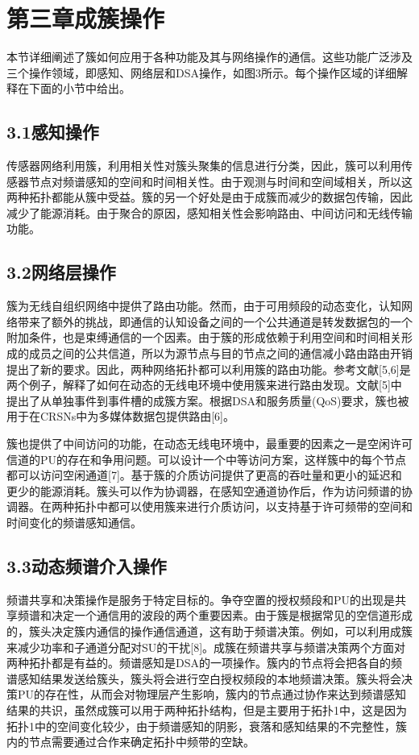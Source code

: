 \documentclass[a4paper,AutoFakeBold,oneside,12pt]{book}
\begin{document}
\chapter*{第三章\quad{}成簇操作}
\newtranschapter 

  本节详细阐述了簇如何应用于各种功能及其与网络操作的通信。这些功能广泛涉及三个操作领域，即感知、网络层和DSA操作，如图3所示。每个操作区域的详细解释在下面的小节中给出。
 
 \section*{3.1\quad{}感知操作}


  传感器网络利用簇，利用相关性对簇头聚集的信息进行分类，因此，簇可以利用传感器节点对频谱感知的空间和时间相关性。由于观测与时间和空间域相关，所以这两种拓扑都能从簇中受益。簇的另一个好处是由于成簇而减少的数据包传输，因此减少了能源消耗。由于聚合的原因，感知相关性会影响路由、中间访问和无线传输功能。
  
 \section*{3.2\quad{}网络层操作}

  簇为无线自组织网络中提供了路由功能。然而，由于可用频段的动态变化，认知网络带来了额外的挑战，即通信的认知设备之间的一个公共通道是转发数据包的一个附加条件，也是束缚通信的一个因素。由于簇的形成依赖于利用空间和时间相关形成的成员之间的公共信道，所以为源节点与目的节点之间的通信减小路由路由开销提出了新的要求。因此，两种网络拓扑都可以利用簇的路由功能。参考文献[5,6]是两个例子，解释了如何在动态的无线电环境中使用簇来进行路由发现。文献[5]中提出了从单独事件到事件槽的成簇方案。根据DSA和服务质量(QoS)要求，簇也被用于在CRSNs中为多媒体数据包提供路由[6]。

  簇也提供了中间访问的功能，在动态无线电环境中，最重要的因素之一是空闲许可信道的PU的存在和争用问题。可以设计一个中等访问方案，这样簇中的每个节点都可以访问空闲通道[7]。基于簇的介质访问提供了更高的吞吐量和更小的延迟和更少的能源消耗。簇头可以作为协调器，在感知空通道协作后，作为访问频谱的协调器。在两种拓扑中都可以使用簇来进行介质访问，以支持基于许可频带的空间和时间变化的频谱感知通信。

 \section*{3.3\quad{}动态频谱介入操作}

  频谱共享和决策操作是服务于特定目标的。争夺空置的授权频段和PU的出现是共享频谱和决定一个通信用的波段的两个重要因素。由于簇是根据常见的空信道形成的，簇头决定簇内通信的操作通信通道，这有助于频谱决策。例如，可以利用成簇来减少功率和子通道分配对SU的干扰[8]。成簇在频谱共享与频谱决策两个方面对两种拓扑都是有益的。频谱感知是DSA的一项操作。簇内的节点将会把各自的频谱感知结果发送给簇头，簇头将会进行空白授权频段的本地频谱决策。簇头将会决策PU的存在性，从而会对物理层产生影响，簇内的节点通过协作来达到频谱感知结果的共识，虽然成簇可以用于两种拓扑结构，但是主要用于拓扑1中，这是因为拓扑1中的空间变化较少，由于频谱感知的阴影，衰落和感知结果的不完整性，簇内的节点需要通过合作来确定拓扑中频带的空缺。
\end{document}

